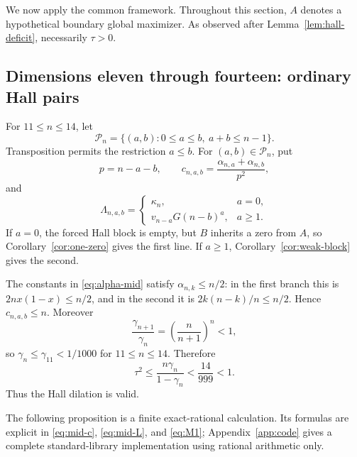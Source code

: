 \documentclass[11pt]{article}
\theoremstyle{definition}
\newcommand{\1}{\mathbf{1}}
\begin{document}
We now apply the common framework.  Throughout this section, $A$ denotes a hypothetical boundary global maximizer.  As observed after Lemma~\ref{lem:hall-deficit}, necessarily $\tau>0$.

\subsection{Dimensions eleven through fourteen: ordinary Hall pairs}

For $11\le n\le14$, let
\[
 \mathcal P_n=
 \{(a,b):0\le a\le b,\ a+b\le n-1\}.
\]
Transposition permits the restriction $a\le b$.  For $(a,b)\in\mathcal P_n$, put
\[
 p=n-a-b,
 \qquad
 c_{n,a,b}=
 \frac{\alpha_{n,a}+\alpha_{n,b}}{p^2},
 \tag{6.1}\label{eq:mid-c}
\]
and
\[
 \Lambda_{n,a,b}=
 \begin{cases}
  \kappa_n,&a=0,\\[1mm]
  v_{n-a}G(n-b)^a,&a\ge1.
 \end{cases}
 \tag{6.2}\label{eq:mid-L}
\]
If $a=0$, the forced Hall block is empty, but $B$ inherits a zero from $A$, so Corollary~\ref{cor:one-zero} gives the first line.  If $a\ge1$, Corollary~\ref{cor:weak-block} gives the second.

The constants in \eqref{eq:alpha-mid} satisfy $\alpha_{n,k}\le n/2$: in the first branch this is $2n x(1-x)\le n/2$, and in the second it is $2k(n-k)/n\le n/2$.  Hence $c_{n,a,b}\le n$.  Moreover
\[
 \frac{\gamma_{n+1}}{\gamma_n}=\left(\frac{n}{n+1}\right)^n<1,
\]
so $\gamma_n\le\gamma_{11}<1/1000$ for $11\le n\le14$.  Therefore
\[
 \tau^2\le\frac{n\gamma_n}{1-\gamma_n}
 <\frac{14}{999}<1.
\]
Thus the Hall dilation is valid.

The following proposition is a finite exact-rational calculation.  Its formulas are explicit in \eqref{eq:mid-c}, \eqref{eq:mid-L}, and \eqref{eq:M1}; Appendix~\ref{app:code} gives a complete standard-library implementation using rational arithmetic only.
\end{document}
